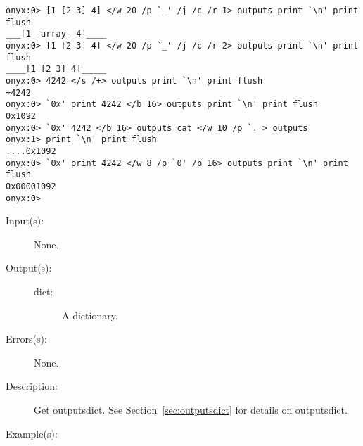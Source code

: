 \begin{description}
\begin{description}
\begin{verbatim}
onyx:0> [1 [2 3] 4] </w 20 /p `_' /j /c /r 1> outputs print `\n' print flush
___[1 -array- 4]____
onyx:0> [1 [2 3] 4] </w 20 /p `_' /j /c /r 2> outputs print `\n' print flush
____[1 [2 3] 4]_____
onyx:0> 4242 </s /+> outputs print `\n' print flush
+4242
onyx:0> `0x' print 4242 </b 16> outputs print `\n' print flush
0x1092
onyx:0> `0x' 4242 </b 16> outputs cat </w 10 /p `.'> outputs 
onyx:1> print `\n' print flush
....0x1092
onyx:0> `0x' print 4242 </w 8 /p `0' /b 16> outputs print `\n' print flush
0x00001092
onyx:0>
		\end{verbatim}
	\end{description}
\label{systemdict:outputsdict}
\item[{\onyxop{--}{outputsdict}{dict}}: ]
	\begin{description}\item[]
	\item[Input(s): ] None.
	\item[Output(s): ]
		\begin{description}\item[]
		\item[dict: ]
			A dictionary.
		\end{description}
	\item[Errors(s): ] None.
	\item[Description: ]
		Get outputsdict.  See Section~\ref{sec:outputsdict} for details
		on outputsdict.
	\item[Example(s): ]\begin{verbatim}


\end{verbatim}
\end{description}
\end{description}
